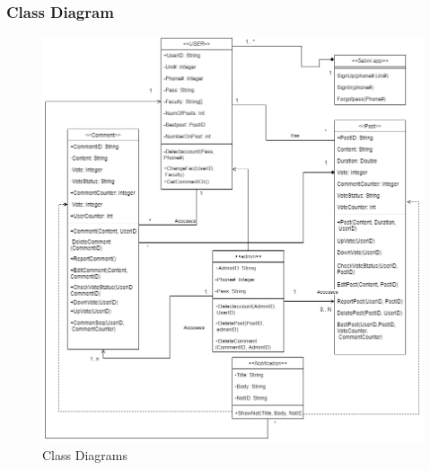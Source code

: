 \documentclass[12pt]{article}
\begin{document}
\sectionbreak
\vspace{+6em}
\subsubsection{Class Diagram}
\vspace{-1.4em}
\begin{figure}[h!]
\centerline{\includegraphics[width=1.1\textwidth]{./ClassDiagram/ClassDiagram.PNG}}
  \caption{Class Diagrams}
\end{figure}
\sectionbreak
\clearpage
\end{document}
